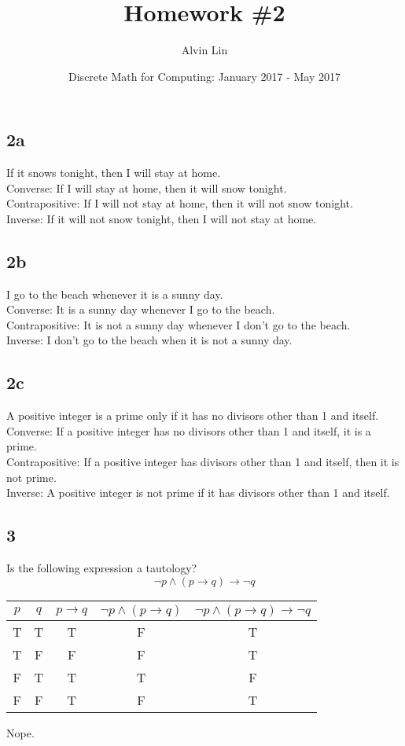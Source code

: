\documentclass[letterpaper, 12pt]{math}
\title{Homework \#2}
\author{Alvin Lin}
\date{Discrete Math for Computing: January 2017 - May 2017}
\begin{document}
\maketitle

\subsection*{2a}
If it snows tonight, then I will stay at home. \\
Converse: If I will stay at home, then it will snow tonight. \\
Contrapositive: If I will not stay at home, then it will not snow
tonight. \\
Inverse: If it will not snow tonight, then I will not stay at home.

\subsection*{2b}
I go to the beach whenever it is a sunny day. \\
Converse: It is a sunny day whenever I go to the beach. \\
Contrapositive: It is not a sunny day whenever I don't go to the beach. \\
Inverse: I don't go to the beach when it is not a sunny day.

\subsection*{2c}
A positive integer is a prime only if it has no divisors other than 1 and
itself. \\
Converse: If a positive integer has no divisors other than 1 and itself, it is
a prime. \\
Contrapositive: If a positive integer has divisors other than 1 and itself,
then it is not prime. \\
Inverse: A positive integer is not prime if it has divisors other than 1 and
itself.

\subsection*{3}
Is the following expression a tautology?
\[ \neg{p} \wedge (p \to q) \to \neg{q} \]
\begin{center}
  \begin{tabular}{|c|c|c|c|c|}
    \hline
    \( p \) & \( q \) & \( p \to q \) & \( \neg{p} \wedge (p \to q) \) &
    \( \neg{p} \wedge (p \to q) \to \neg{q} \) \\ \hline
    T & T & T & F & T \\ \hline
    T & F & F & F & T \\ \hline
    F & T & T & T & F \\ \hline
    F & F & T & F & T \\ \hline
  \end{tabular}
\end{center}
Nope.
\end{document}
